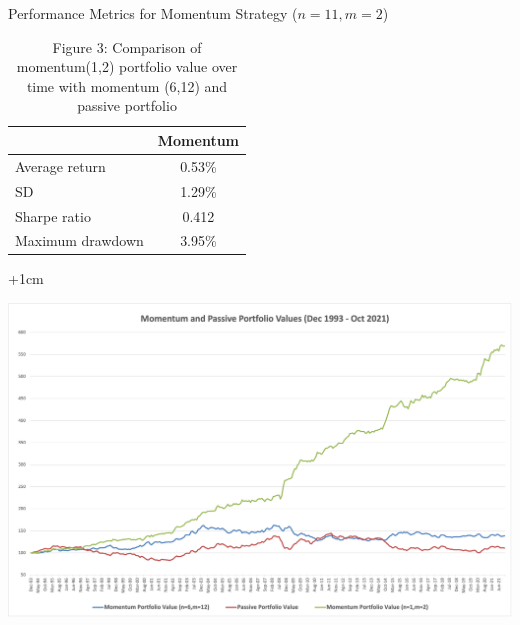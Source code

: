 \documentclass{article}
\begin{document}
\begin{table}[h]
    \small %
    \begin{minipage}{0.3\linewidth}
        \begin{adjustwidth}{-0.1cm}{}
            \centering
            \captionsetup{font = footnotesize}
            \caption{\centering Performance Metrics for Momentum Strategy ($n=11,m=2$)}
            \label{table:performance2}
            \begin{tabular}{lc}
                \toprule
                & \textbf{Momentum} \\
                \midrule
                Average return & 0.53\% \\
                SD & 1.29\% \\
                Sharpe ratio & 0.412 \\
                Maximum drawdown & 3.95\% \\
                \bottomrule
            \end{tabular}
        \end{adjustwidth}
    \end{minipage}%
    \hspace{\fill} %
    \begin{minipage}{0.6\linewidth} %
        \begin{adjustwidth}{+1cm}{}
            \centering
            \label{fig:3}
            \captionsetup{font=footnotesize,width=\linewidth}
            \caption*{\centering Figure 3: Comparison of momentum(1,2) portfolio value over time with momentum (6,12) and passive portfolio}
            \includegraphics[width=\linewidth]{Figure 3.png}
        
        \end{adjustwidth}
    \end{minipage}
\end{table}
\end{document}
